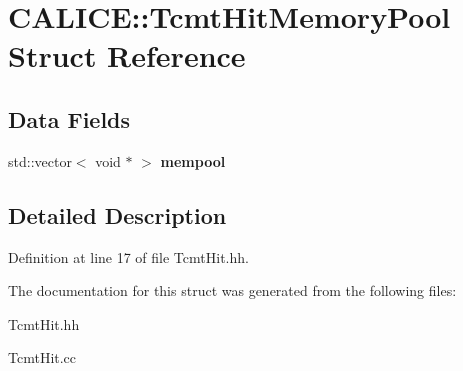 \section{C\-A\-L\-I\-C\-E\-:\-:Tcmt\-Hit\-Memory\-Pool Struct Reference}
\label{structCALICE_1_1TcmtHitMemoryPool}
\subsection*{Data Fields}
\begin{DoxyCompactItemize}
\item 
std\-::vector$<$ void $\ast$ $>$ {\bfseries mempool}\label{structCALICE_1_1TcmtHitMemoryPool_a41a4855621ec1975f0ec3f956087bd28}

\end{DoxyCompactItemize}


\subsection{Detailed Description}


Definition at line 17 of file Tcmt\-Hit.\-hh.



The documentation for this struct was generated from the following files\-:\begin{DoxyCompactItemize}
\item 
Tcmt\-Hit.\-hh\item 
Tcmt\-Hit.\-cc\end{DoxyCompactItemize}
